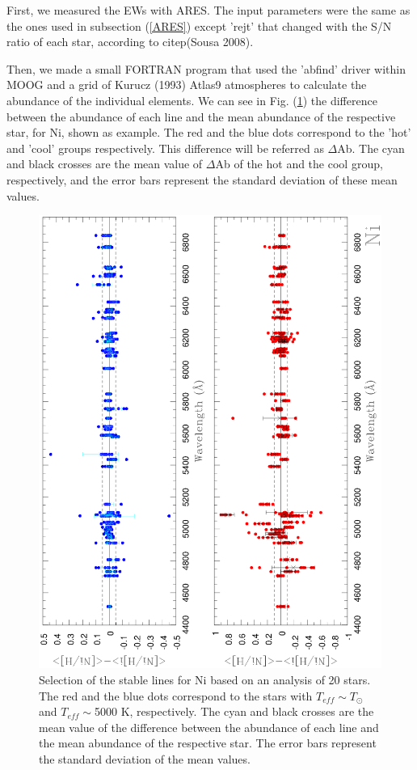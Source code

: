 \documentclass[dvips,12pt,a4paper]{report}
\begin{document}
{First, we measured the EWs with ARES. The input parameters were the same as the ones used in subsection (\ref{ARES}) except 'rejt' that changed with the S/N ratio of each star, according to citep(Sousa 2008). 

Then, we made a small FORTRAN program that used the 'abfind' driver within MOOG and a grid of Kurucz (1993) Atlas9 atmospheres to calculate the abundance of the individual elements. We can see in Fig. (\ref{Ni20}) the difference between the abundance of each line and the mean abundance of the respective star, for Ni, shown as example. The red and the blue dots correspond to the 'hot' and 'cool' groups respectively. This difference will be referred as $\Delta$Ab. The cyan and black crosses are the mean value of $\Delta$Ab of the hot and the cool group, respectively, and the error bars represent the standard deviation of these mean values. 

\begin{figure}[h]
\centering
\includegraphics[height=13 cm, angle=-90]{pics/Ni20.eps}
\caption[20 star delta ab graphics]{Selection of the stable lines for Ni based on an analysis of 20 stars. The red and the blue dots correspond to the stars with $T_{eff}\sim T_\odot$ and $T_{eff}\sim$5000 K, respectively. The cyan and black crosses are the mean value of the difference between the abundance of each line and the mean abundance of the respective star. The error bars represent the standard deviation of the mean values.}
\label{Ni20}
\end{figure}

}
\end{document}
